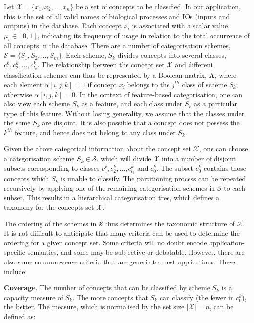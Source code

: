 Let $\mathcal{X} = \{ x_{1}, x_{2}, \ldots, x_{n} \}$ be a set of concepts to be classified.
In our application, this is the set of all valid names of biological processes and IOs (inputs and outputs) in the database.
Each concept $x_i$ is associated with a scalar value, $\mu_i \in [0, 1]$, indicating its frequency of usage in relation to the total occurrence of all concepts in the database.
There are a number of categorisation schemes, $\mathcal{S} = \{ S_1, S_2, \ldots, S_m \}$.
Each scheme, $S_k$ divides concepts into several classes, $c^k_1, c^k_2, \ldots, c^k_{l_k}$.
The relationship between the concept set $\mathcal{X}$ and different classification schemes can thus be represented by a Boolean matrix, $\mathbf{A}$, where each element $\alpha[i,j,k] = 1$ if concept $x_i$ belongs to the $j^{th}$ class of scheme $S_k$; otherwise $\alpha[i,j,k] = 0$.
In the context of feature-based categorisation, one can also view each scheme $S_k$ as a feature, and each class under $S_k$ as a particular type of this feature.
Without losing generality, we assume that the classes under the same $S_k$ are disjoint.
It is also possible that a concept does not possess the $k^{th}$ feature, and hence does not belong to any class under $S_k$.

Given the above categorical information about the concept set $\mathcal{X}$, one can choose a categorisation scheme $S_k \in \mathcal{S}$, which will divide $\mathcal{X}$ into a number of disjoint subsets corresponding to classes $c^k_1, c^k_2, \ldots, c^k_{l_k}$ and $c^k_0$.
The subset $c^k_0$ contains those concepts which $S_k$ is unable to classify.
The partitioning process can be repeated recursively by applying one of the remaining categorisation schemes in $\mathcal{S}$ to each subset.
This results in a hierarchical categorisation tree, which defines a taxonomy for the concepts set $\mathcal{X}$.

The ordering of the schemes in $\mathcal{S}$ thus determines the taxonomic structure of $\mathcal{X}$.
It is not difficult to anticipate that many criteria can be used to determine the ordering for a given concept set.
Some criteria will no doubt encode application-specific semantics, and some may be subjective or debatable.
However, there are also some common-sense criteria that are generic to most applications.
These include:

\textbf{Coverage}.
The number of concepts that can be classified by scheme $S_k$ is a capacity measure of $S_k$.
The more concepts that $S_k$ can classify (the fewer in $c^k_0$), the better.
The measure, which is normalised by the set size $\mid\!\mathcal{X}\!\!\mid=n$, can be defined as:

